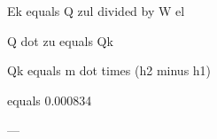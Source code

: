 Ek equals Q zul divided by W el  

Q dot zu equals Qk  

Qk equals m dot times (h2 minus h1)  

equals 0.000834  

---